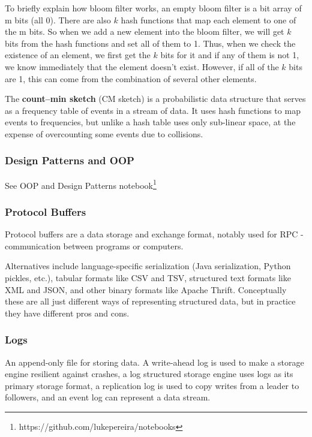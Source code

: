 \documentclass{article}
\begin{document}
    To briefly explain how bloom filter works, an empty bloom filter is a bit array of m bits (all 0). There are also $k$ hash functions that map each element to one of the m bits. So when we add a new element into the bloom filter, we will get $k$ bits from the hash functions and set all of them to 1. Thus, when we check the existence of an element, we first get the $k$ bits for it and if any of them is not 1, we know immediately that the element doesn't exist. However, if all of the $k$ bits are 1, this can come from the combination of several other elements.
    
    
    The \textbf{count–min sketch} (CM sketch) is a probabilistic data structure that serves as a frequency table of events in a stream of data. It uses hash functions to map events to frequencies, but unlike a hash table uses only sub-linear space, at the expense of overcounting some events due to collisions.
    
    \subsubsection{Design Patterns and OOP}
    See OOP and Design Patterns notebook\footnote{https://github.com/lukepereira/notebooks}
    
    \subsubsection{Protocol Buffers}
    Protocol buffers are a data storage and exchange format, notably used for RPC - communication between programs or computers.
    
    Alternatives include language-specific serialization (Java serialization, Python pickles, etc.), tabular formats like CSV and TSV, structured text formats like XML and JSON, and other binary formats like Apache Thrift. Conceptually these are all just different ways of representing structured data, but in practice they have different pros and cons.

    
    \subsubsection{Logs}
    An append-only file for storing data. A write-ahead log is used to make a storage engine resilient against crashes, a log structured storage engine uses logs as its primary storage format, a replication log is used to copy writes from a leader to followers, and an event log can represent a data stream.
    
\end{document}
